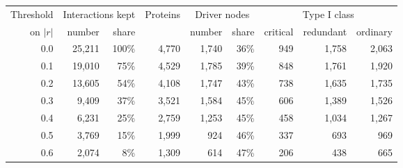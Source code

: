 \begin{tabular}{rrrrrrrrr}
\toprule
Threshold & \multicolumn{2}{c}{Interactions kept} & Proteins & \multicolumn{2}{c}{Driver nodes} & \multicolumn{3}{c}{Type I class} \\
\cmidrule(lr){2-3}\cmidrule(lr){5-6}\cmidrule(lr){7-9}
on $|r|$ & number & share & & number & share & critical & redundant & ordinary \\
\midrule
0.0 & 25,211 & 100\% & 4,770 & 1,740 & 36\% & 949 & 1,758 & 2,063 \\
0.1 & 19,010 & 75\% & 4,529 & 1,785 & 39\% & 848 & 1,761 & 1,920 \\
0.2 & 13,605 & 54\% & 4,108 & 1,747 & 43\% & 738 & 1,635 & 1,735 \\
0.3 & 9,409 & 37\% & 3,521 & 1,584 & 45\% & 606 & 1,389 & 1,526 \\
0.4 & 6,231 & 25\% & 2,759 & 1,253 & 45\% & 458 & 1,034 & 1,267 \\
0.5 & 3,769 & 15\% & 1,999 & 924 & 46\% & 337 & 693 & 969 \\
0.6 & 2,074 & 8\% & 1,309 & 614 & 47\% & 206 & 438 & 665 \\
\bottomrule
\end{tabular}
